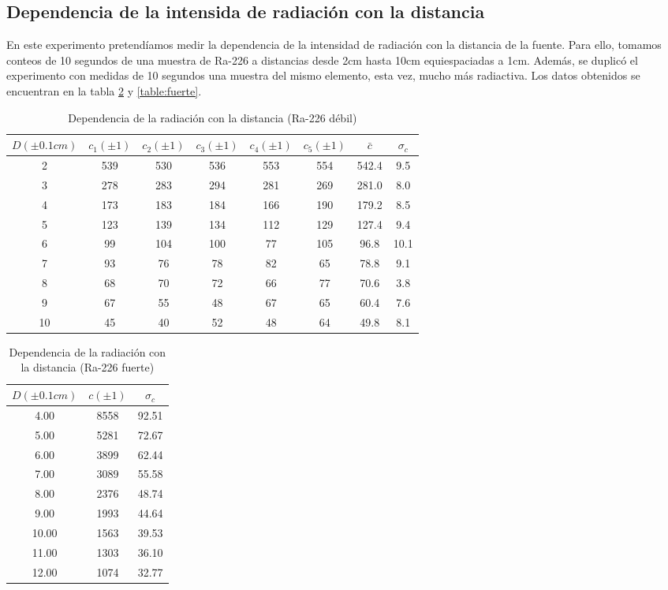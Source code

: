\documentclass[%
 reprint,
 amsmath,amssymb,
 aps,
]{revtex4-1}
\begin{document}
\subsection{\label{sec:level2}Dependencia de la intensida de radiación con la distancia}
En este experimento pretendíamos medir la dependencia de la intensidad de radiación con la distancia de la fuente. Para ello, tomamos conteos de 10 segundos de una muestra de Ra-226 a distancias desde 2cm hasta 10cm equiespaciadas a 1cm. Además, se duplicó el experimento con medidas de 10 segundos una muestra del mismo elemento, esta vez, mucho más radiactiva. Los datos obtenidos se encuentran en la tabla \ref{table:distancia} y \ref{table:fuerte}.\\


\begin{table}[h!]
\centering
\begin{tabular}{|c|c|c|c|c|c|c|c|}
	\hline $D(\pm0.1cm)$& $c_1(\pm1)$ & $c_2(\pm1)$ & $c_3(\pm1)$& $c_4(\pm1)$& $c_5(\pm1)$& $\bar{c}$ & $\sigma_c$\\
	\hline\hline
	2 & 539 & 530 & 536 & 553 & 554 & 542.4 & 9.5\\
	3 & 278 & 283 & 294 & 281 & 269 & 281.0 & 8.0\\
	4 & 173 & 183 & 184 & 166 & 190 & 179.2 & 8.5\\
	5 & 123 & 139 & 134 & 112 & 129 & 127.4 & 9.4\\
	6 & 99  & 104 & 100 & 77  & 105 & 96.8  & 10.1\\
	7 & 93  & 76  & 78  & 82  & 65  & 78.8  & 9.1\\
	8 & 68  & 70  & 72  & 66  & 77  & 70.6  & 3.8\\
	9 & 67  & 55  & 48  & 67  & 65  & 60.4  & 7.6\\
	10& 45  & 40  & 52  & 48  & 64  & 49.8  & 8.1\\
	[1ex] 
 \hline
 \end{tabular} 
  \caption{Dependencia de la radiación con la distancia (Ra-226 débil)}
\label{table:distancia} 
\end{table}

\begin{table}[h!]
\centering
\begin{tabular}{|c|c|c|}
	\hline $D(\pm0.1cm)$& $c(\pm1)$& $\sigma_c$\\
	\hline\hline
	4.00&8558&92.51\\
	5.00&5281&72.67\\
	6.00&3899&62.44\\
	7.00&3089&55.58\\
	8.00&2376&48.74\\
	9.00&1993&44.64\\
	10.00&1563&39.53\\
	11.00&1303&36.10\\
	12.00&1074&32.77\\
	[1ex] 
	\hline
 \end{tabular} 
  \caption{Dependencia de la radiación con la distancia (Ra-226 fuerte)}
\label{table:distancia} 
\end{table}
\end{document}
